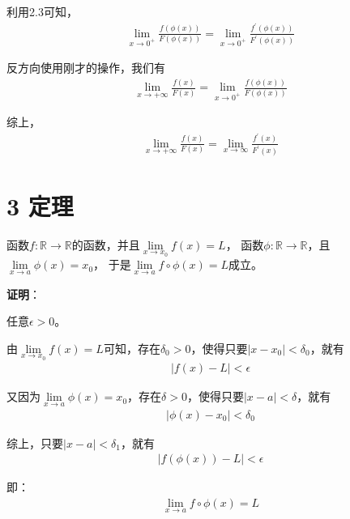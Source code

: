 \documentclass{article}
\begin{document}
利用2.3可知，
\begin{align*}
  \lim\limits_{x \to 0^{+}} \frac{f(\phi(x))}{F(\phi(x))}
  =
  \lim\limits_{x \to 0^{+}} \frac{f^\prime(\phi(x))}{F^\prime(\phi(x))}
\end{align*}

反方向使用刚才的操作，我们有
\begin{align*}
  \lim\limits_{x \to +\infty} \frac{f(x)}{F(x)}
  =
  \lim\limits_{x \to 0^{+}} \frac{f(\phi(x))}{F(\phi(x))}
\end{align*}

综上，
\begin{align*}
  \lim\limits_{x \to +\infty} \frac{f(x)}{F(x)}
  =
  \lim\limits_{x \to \infty} \frac{f^\prime(x)}{F^\prime(x)}
\end{align*}

\section*{3 定理}

\begin{zremark}

  函数$f: \mathbb{R} \to \mathbb{R}$的函数，并且$\lim\limits_{x \to x_0} f(x) = L$，
  函数$\phi: \mathbb{R} \to \mathbb{R}$，且$\lim\limits_{x \to a} \phi(x) = x_0$，
  于是$\lim\limits_{x \to a} f\circ\phi(x) = L$成立。

\end{zremark}

\textbf{证明}：

任意$\epsilon > 0$。

由$\lim\limits_{x \to x_0} f(x) = L$可知，存在$\delta_0 > 0$，使得只要$|x - x_0| < \delta_0$，就有
\begin{align*}
  |f(x) - L| < \epsilon
\end{align*}

又因为$\lim\limits_{x \to a} \phi(x) = x_0$，存在$\delta > 0$，使得只要$|x - a| < \delta$，就有
\begin{align*}
  |\phi(x) - x_0| < \delta_0
\end{align*}

综上，只要$|x - a| < \delta_1$，就有
\begin{align*}
  |f(\phi(x)) - L| < \epsilon
\end{align*}

即：
\begin{align*}
  \lim\limits_{x \to a} f\circ\phi(x) = L
\end{align*}
\end{document}
